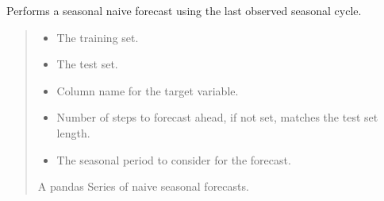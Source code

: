 \documentclass[letterpaper,10pt,english]{sphinxmanual}
\begin{document}
\begin{fulllineitems}
\label{\detokenize{docs/utilities:utilities.naive_seasonal_forecast}}
\pysigstartsignatures
{}
\pysigstopsignatures
\sphinxAtStartPar
Performs a seasonal naive forecast using the last observed seasonal cycle.
\begin{quote}\begin{description}
\begin{itemize}
\item {} 
\sphinxAtStartPar
{} \textendash{} The training set.

\item {} 
\sphinxAtStartPar
{} \textendash{} The test set.

\item {} 
\sphinxAtStartPar
{} \textendash{} Column name for the target variable.

\item {} 
\sphinxAtStartPar
{} \textendash{} Number of steps to forecast ahead, if not set, matches the test set length.

\item {} 
\sphinxAtStartPar
{} \textendash{} The seasonal period to consider for the forecast.

\end{itemize}

\sphinxAtStartPar
A pandas Series of naive seasonal forecasts.

\end{description}\end{quote}

\end{fulllineitems}

\end{document}
